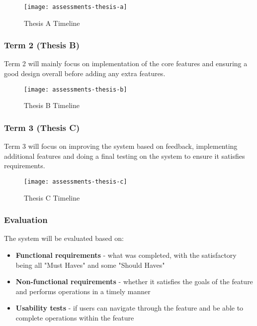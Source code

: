 \begin{figure}[h!]
	\centering
	\texttt{[image: assessments-thesis-a]}
	\caption{Thesis A Timeline}
\end{figure}

\subsubsection{Term 2 (Thesis B)}
Term 2 will mainly focus on implementation of the core features and ensuring a good design overall before adding any extra features.\\

\begin{figure}[h!]
	\centering
	\texttt{[image: assessments-thesis-b]}
	\caption{Thesis B Timeline}
\end{figure}

\subsubsection{Term 3 (Thesis C)}
Term 3 will focus on improving the system based on feedback, implementing additional features and doing a final testing on the system to ensure it satisfies requirements.\\

\begin{figure}[h!]
	\centering
	\texttt{[image: assessments-thesis-c]}
	\caption{Thesis C Timeline}
\end{figure}


\subsubsection{Evaluation}
The system will be evaluated based on:
\begin{itemize}
	\item \textbf{Functional requirements} - what was completed, with the satisfactory being all "Must Haves" and some "Should Haves"
	\item \textbf{Non-functional requirements} - whether it satisfies the goals of the feature and performs operations in a timely manner
	\item \textbf{Usability tests} - if users can navigate through the feature and be able to complete operations within the feature
\end{itemize}


\newpage